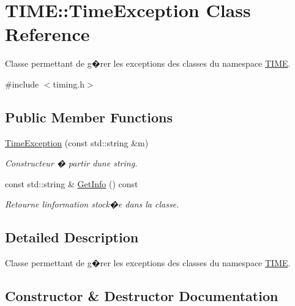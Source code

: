 \hypertarget{class_t_i_m_e_1_1_time_exception}{}\section{T\+I\+M\+E\+:\+:Time\+Exception Class Reference}
\label{class_t_i_m_e_1_1_time_exception}


Classe permettant de g�rer les exceptions des classes du namespace \hyperlink{namespace_t_i_m_e}{T\+I\+M\+E}.  




{\ttfamily \#include $<$timing.\+h$>$}

\subsection*{Public Member Functions}
\begin{DoxyCompactItemize}
\item 
\hyperlink{class_t_i_m_e_1_1_time_exception_a08502d82065dd79b27cd954b45f4d5c7}{Time\+Exception} (const std\+::string \&m)
\begin{DoxyCompactList}\small\item\em Constructeur � partir d\textquotesingle{}une string. \end{DoxyCompactList}\item 
const std\+::string \& \hyperlink{class_t_i_m_e_1_1_time_exception_ad86c212253ea1b8654f4cae34611d634}{Get\+Info} () const 
\begin{DoxyCompactList}\small\item\em Retourne l\textquotesingle{}information stock�e dans la classe. \end{DoxyCompactList}\end{DoxyCompactItemize}


\subsection{Detailed Description}
Classe permettant de g�rer les exceptions des classes du namespace \hyperlink{namespace_t_i_m_e}{T\+I\+M\+E}. 

\subsection{Constructor \& Destructor Documentation}
\hypertarget{class_t_i_m_e_1_1_time_exception_a08502d82065dd79b27cd954b45f4d5c7}{}
